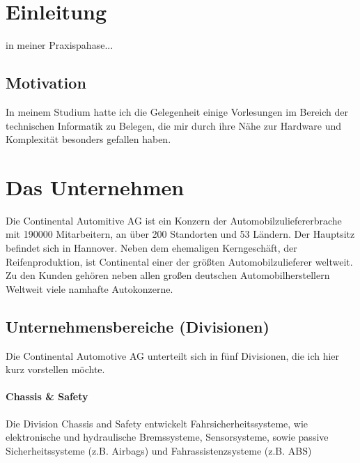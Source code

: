 \section{Einleitung}
in meiner Praxispahase...
\subsection{Motivation}
In meinem Studium hatte ich die Gelegenheit einige Vorlesungen im Bereich der technischen Informatik zu Belegen, die mir durch ihre Nähe zur Hardware und Komplexität besonders gefallen haben.
\section{Das Unternehmen}


Die Continental Automitive AG ist ein Konzern der Automobilzuliefererbrache mit 190000 Mitarbeitern, an über 200 Standorten und 53 Ländern. Der Hauptsitz befindet sich in Hannover. Neben dem ehemaligen Kerngeschäft, der Reifenproduktion, ist Continental einer der größten Automobilzulieferer weltweit. Zu den Kunden gehören neben allen großen deutschen Automobilherstellern Weltweit viele namhafte Autokonzerne.




\subsection{Unternehmensbereiche (Divisionen)}


Die Continental Automotive AG unterteilt sich in fünf Divisionen, die ich hier kurz vorstellen möchte. 

\paragraph{Chassis \& Safety}
Die Division Chassis and Safety entwickelt Fahrsicherheitssysteme, wie elektronische und hydraulische Bremssysteme, Sensorsysteme, sowie passive Sicherheitssysteme (z.B. Airbags) und Fahrassistenzsysteme (z.B. ABS) 

